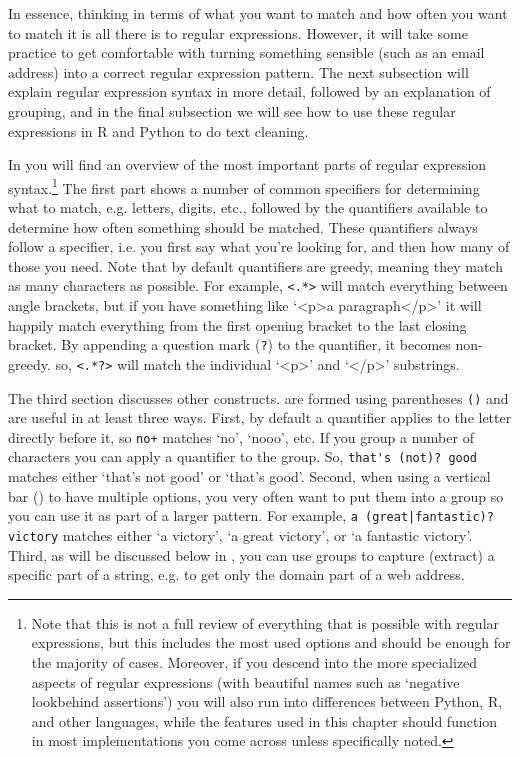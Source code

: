 In essence, thinking in terms of what you want to match and how often
you want to match it is all there is to regular expressions.
However, it will take some practice to get comfortable with turning something sensible (such as an email address) into a correct regular expression pattern.
The next subsection will explain regular expression syntax in more detail, followed by an explanation of grouping,
and in the final subsection we will see how to use these regular expressions in R and Python to do text cleaning. 

\newcommand{\fnregexnote}{\footnote{Note that this is not a full review of everything that is possible with regular expressions, but this includes the most used options and should be enough for the majority of cases. Moreover, if you descend into the more specialized aspects of regular expressions (with beautiful names such as `negative lookbehind assertions') you will also run into differences between Python, R, and other languages, while the features used in this chapter should function in most implementations you come across unless specifically noted.}}





In  you will find an overview of the most important parts of regular expression syntax.\fnregexnote
The first part shows a number of common specifiers for determining what to match, e.g. letters, digits, etc.,
followed by the quantifiers available to determine how often something should be matched.
These quantifiers always follow a specifier, i.e. you first say what you're looking for, and then how many of those you need.
Note that by default quantifiers are greedy, meaning they match as many characters as possible.
For example, \verb|<.*>| will match everything between angle brackets, but if you have something like `<p>a paragraph</p>'
it will happily match everything from the first opening bracket to the last closing bracket.
By appending a question mark (\verb|?|) to the quantifier, it becomes non-greedy.
so, \verb|<.*?>| will match the individual `<p>' and `</p>' substrings. 

The third section discusses other constructs.
 are formed using parentheses \verb|()| and are useful in at least three ways. 
First, by default a quantifier applies to the letter directly before it, so \verb|no+| matches `no', `nooo', etc.
If you group a number of characters you can apply a quantifier to the group. So, \verb|that's (not)? good| matches either `that's not good' or `that's good'.
Second, when using a vertical bar (\textbar) to have multiple options, you very often want to put them into a group so you can use it as part of a larger pattern.
For example, \verb!a (great|fantastic)? victory! matches either `a victory', `a great victory', or `a fantastic victory'.
Third, as will be discussed below in , you can use groups to capture (extract) a specific part of a string, e.g. to get only the domain part of a web address. 

